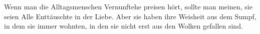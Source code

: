 Wenn man die Alltagsmenschen Vernunftehe preisen hört, sollte man meinen, sie seien Alle Enttäuschte in der Liebe. Aber sie haben ihre Weisheit aus dem Sumpf, in dem sie immer wohnten, in den sie nicht erst aus den Wolken gefallen sind.
\par

